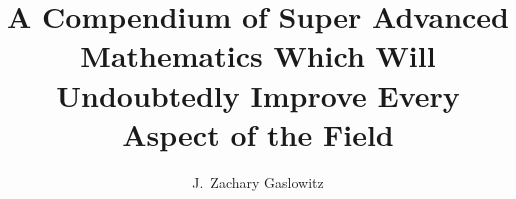 \documentclass[12pt, letterpaper]{vuabstract}
\title{A Compendium of Super Advanced Mathematics Which Will Undoubtedly Improve Every Aspect of the Field}
\author{J.\ Zachary Gaslowitz}
\begin{document}
\makeheader

\blindtext

\blindtext

\signatureline
\end{document}

